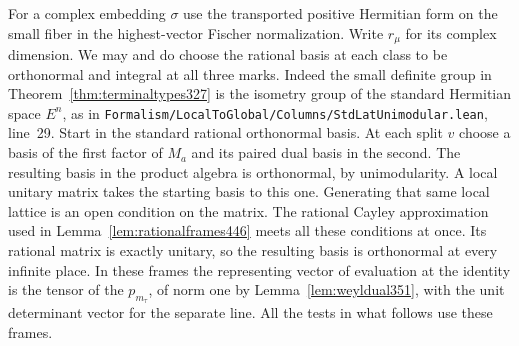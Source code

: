 \documentclass[a4paper,11pt]{article}
\theoremstyle{definition}
\theoremstyle{remark}
\newcommand{\srcloc}[2]{{\small\nolinkurl{#1.lean}}, line~#2}
\numberwithin{equation}{section}
\begin{document}
For a complex embedding \(\sigma\) use the transported positive
Hermitian form on the small fiber in the highest-vector Fischer
normalization. Write \(r_\mu\) for its complex dimension. We may
and do choose the rational basis at each class to be orthonormal
and integral at all three marks. Indeed the small definite group
in Theorem~\ref{thm:terminaltypes327} is the isometry group of
the standard Hermitian space \(E^n\), as in
\srcloc{Formalism/LocalToGlobal/Columns/StdLatUnimodular}{29}.
Start in the standard rational orthonormal basis. At each split
\(v\) choose a basis of the first factor of \(M_a\) and its paired
dual basis in the second. The resulting basis in the product
algebra is orthonormal, by unimodularity. A local unitary matrix
takes the starting basis to this one. Generating that same local
lattice is an open condition on the matrix. The rational Cayley
approximation used in Lemma~\ref{lem:rationalframes446} meets all
these conditions at once. Its rational matrix is exactly unitary,
so the resulting basis is orthonormal at every infinite place.
In these frames the representing vector of evaluation at the
identity is the tensor of the \(p_{m_\tau}\), of norm one by
Lemma~\ref{lem:weyldual351}, with the unit determinant vector for
the separate line. All the tests in what follows use these frames.
\end{document}
